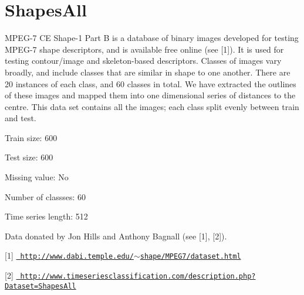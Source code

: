 \chapter{Shapes\+All}
\hypertarget{md_external_2data_2UCRArchive__2018_2ShapesAll_2README}{}\label{md_external_2data_2UCRArchive__2018_2ShapesAll_2README}
\label{md_external_2data_2UCRArchive__2018_2ShapesAll_2README_autotoc_md209}%
%
 MPEG-\/7 CE Shape-\/1 Part B is a database of binary images developed for testing MPEG-\/7 shape descriptors, and is available free online (see \mbox{[}1\mbox{]}). It is used for testing contour/image and skeleton-\/based descriptors. Classes of images vary broadly, and include classes that are similar in shape to one another. There are 20 instances of each class, and 60 classes in total. We have extracted the outlines of these images and mapped them into one dimensional series of distances to the centre. This data set contains all the images; each class split evenly between train and test.

Train size\+: 600

Test size\+: 600

Missing value\+: No

Number of classses\+: 60

Time series length\+: 512

Data donated by Jon Hills and Anthony Bagnall (see \mbox{[}1\mbox{]}, \mbox{[}2\mbox{]}).

\mbox{[}1\mbox{]} \href{http://www.dabi.temple.edu/~shape/MPEG7/dataset.html}{\texttt{ http\+://www.\+dabi.\+temple.\+edu/\texorpdfstring{$\sim$}{\string~}shape/\+MPEG7/dataset.\+html}}

\mbox{[}2\mbox{]} \href{http://www.timeseriesclassification.com/description.php?Dataset=ShapesAll}{\texttt{ http\+://www.\+timeseriesclassification.\+com/description.\+php?\+Dataset=\+Shapes\+All}} 
